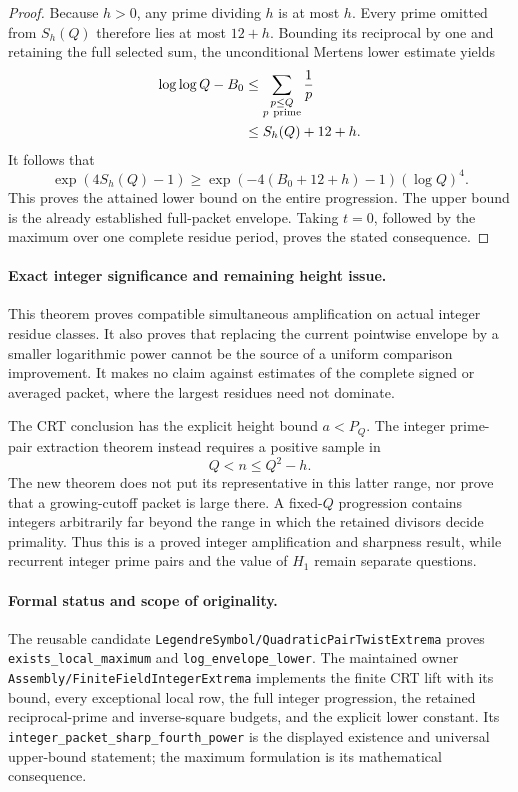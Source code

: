 \documentclass[11pt]{article}
\begin{document}
\begin{proof}
Because \(h>0\), any prime dividing \(h\) is at most \(h\).
Every prime omitted from \(S_h(Q)\) therefore lies at most \(12+h\).
Bounding its reciprocal by one and retaining the full selected sum,
the unconditional Mertens lower estimate yields
\[
 \begin{split}
 \log\log Q-B_0
 &\leq\sum_{\substack{p\leq Q\\p\ {\rm prime}}}\frac1p\\
 &\leq S_h(Q)+12+h.
 \end{split}
\]
It follows that
\[
 \exp(4S_h(Q)-1)
     \geq\exp(-4(B_0+12+h)-1)(\log Q)^4.
\]
This proves the attained lower bound on the entire progression.
The upper bound is the already established full-packet envelope.
Taking \(t=0\), followed by the maximum over one complete residue
period, proves the stated consequence.
\end{proof}

\paragraph{Exact integer significance and remaining height issue.}
This theorem proves compatible simultaneous amplification on actual
integer residue classes. It also proves that replacing the current
pointwise envelope by a smaller logarithmic power cannot be the source
of a uniform comparison improvement.
It makes no claim against estimates of the complete signed or
averaged packet, where the largest residues need not dominate.

The CRT conclusion has the explicit height bound \(a<P_Q\).
The integer prime-pair extraction theorem instead requires a positive
sample in
\[
                              Q<n\leq Q^2-h.
\]
The new theorem does not put its representative in this latter range,
nor prove that a growing-cutoff packet is large there.
A fixed-\(Q\) progression contains integers arbitrarily far beyond
the range in which the retained divisors decide primality.
Thus this is a proved integer amplification and sharpness result,
while recurrent integer prime pairs and the value of \(H_1\)
remain separate questions.

\paragraph{Formal status and scope of originality.}
The reusable candidate
\texttt{LegendreSymbol/QuadraticPairTwistExtrema}
proves \texttt{exists\_local\_maximum} and
\texttt{log\_envelope\_lower}.
The maintained owner \texttt{Assembly/FiniteFieldIntegerExtrema}
implements the finite CRT lift with its bound, every exceptional
local row, the full integer progression, the retained reciprocal-prime
and inverse-square budgets, and the explicit lower constant.
Its \texttt{integer\_packet\_sharp\_fourth\_power} is the displayed
existence and universal upper-bound statement;
the maximum formulation is its mathematical consequence.
\end{document}
